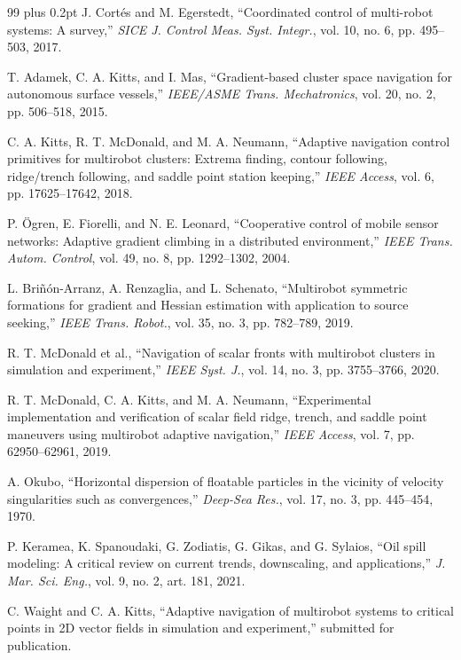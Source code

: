 \documentclass[lettersize,journal]{IEEEtran}
\begin{document}
\begin{thebibliography}{99}
\itemsep 0pt plus 0.2pt
\parskip 0pt
 J. Cortés and M. Egerstedt, ``Coordinated control of multi-robot
systems: A survey,'' \textit{SICE J. Control Meas. Syst. Integr.},
vol. 10, no. 6, pp. 495--503, 2017.

 T. Adamek, C. A. Kitts, and I. Mas, ``Gradient-based cluster space
navigation for autonomous surface vessels,'' \textit{IEEE/ASME Trans.
Mechatronics}, vol. 20, no. 2, pp. 506--518, 2015.

 C. A. Kitts, R. T. McDonald, and M. A. Neumann, ``Adaptive
navigation control primitives for multirobot clusters: Extrema finding,
contour following, ridge/trench following, and saddle point station keeping,''
\textit{IEEE Access}, vol. 6, pp. 17625--17642, 2018.

 P. Ögren, E. Fiorelli, and N. E. Leonard, ``Cooperative control
of mobile sensor networks: Adaptive gradient climbing in a distributed
environment,'' \textit{IEEE Trans. Autom. Control}, vol. 49, no. 8,
pp. 1292--1302, 2004.

 L. Briñón-Arranz, A. Renzaglia, and L. Schenato, ``Multirobot
symmetric formations for gradient and Hessian estimation with application to
source seeking,'' \textit{IEEE Trans. Robot.}, vol. 35, no. 3,
pp. 782--789, 2019.

 R. T. McDonald et al., ``Navigation of
scalar fronts with multirobot clusters in simulation and experiment,''
\textit{IEEE Syst. J.}, vol. 14, no. 3, pp. 3755--3766, 2020.

 R. T. McDonald, C. A. Kitts, and M. A. Neumann, ``Experimental
implementation and verification of scalar field ridge, trench, and saddle
point maneuvers using multirobot adaptive navigation,'' \textit{IEEE Access},
vol. 7, pp. 62950--62961, 2019.

 A. Okubo, ``Horizontal dispersion of floatable particles in the
vicinity of velocity singularities such as convergences,'' \textit{Deep-Sea
Res.}, vol. 17, no. 3, pp. 445--454, 1970.

 P. Keramea, K. Spanoudaki, G. Zodiatis, G. Gikas, and
G. Sylaios, ``Oil spill modeling: A critical review on current trends,
downscaling, and applications,'' \textit{J. Mar. Sci. Eng.}, vol. 9,
no. 2, art. 181, 2021.

 C. Waight and C. A. Kitts, ``Adaptive navigation of multirobot
systems to critical points in 2D vector fields in simulation and
experiment,'' submitted for publication.


\end{thebibliography}
\end{document}
